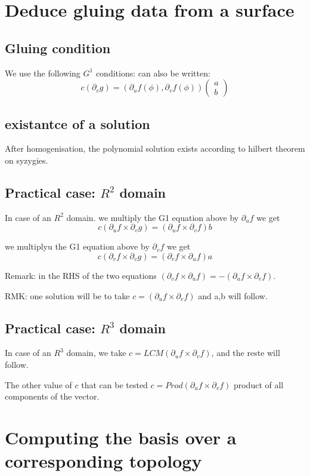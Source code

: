 \documentclass{article}
\begin{document}
\section{Deduce gluing data from a surface}

\subsection{Gluing condition}
We use the following $G^1$ conditions:
can also be written:
$$c(\partial _v g)=(\partial _u f (\phi),\partial _v f (\phi)) \begin{pmatrix} a\\b\end{pmatrix}$$
\subsection{existantce of a solution}
After homogenisation, the polynomial solution exists according to hilbert theorem on syzygies.

\subsection{Practical case: $R^2$ domain}

In case of an $R^2$ domain.
 we multiply the G1 equation above by $\partial _uf$ we get
$$c(\partial_uf\times\partial _vg)=(\partial _uf\times\partial _vf )b$$

 we multiplyu the G1 equation above by $\partial _vf$ we get
$$c(\partial_vf\times\partial _vg)=(\partial _vf\times\partial _uf) a$$

Remark: in the RHS of the two equations $(\partial _vf\times\partial _uf)=-(\partial _uf\times\partial _vf )$.

RMK: one solution will be to take $c=(\partial _uf\times\partial _vf )$ and a,b will follow.
\subsection{Practical case: $R^3$ domain}
In case of an $R^3$ domain, we take $c=LCM(\partial _uf\times\partial _vf )$, and the reste will follow.

The other value of $c$ that can be tested $c=Prod(\partial _uf\times\partial _vf )$ product of all components of the vector.
\section{Computing the basis over a corresponding topology}
\end{document}
